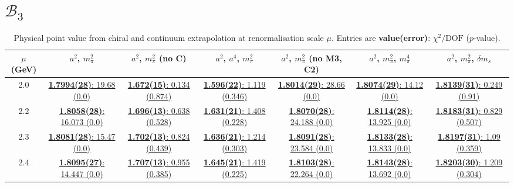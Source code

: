 \documentclass[12pt]{extarticle}
\begin{document}
\section{$\mathcal{B}_3$}
\begin{table}[h!]
\begin{center}
\begin{tabular}{|c|c|c|c|c|c|c|}
\hline
$\mu$ (GeV) & $a^2$, $m_\pi^2$& $a^2$, $m_\pi^2$ (no C)& $a^2$, $a^4$, $m_\pi^2$& $a^2$, $m_\pi^2$ (no M3, C2)& $a^2$, $m_\pi^2$, $m_\pi^4$& $a^2$, $m_\pi^2$, $\delta m_s$\\
\hline
2.0& \hyperlink{SSmPP/NPR/a2m2_20.pdf.1}{\textbf{1.7994(28)}: 19.68 (0.0)} & \hyperlink{SSmPP/NPR/a2m2noC_20.pdf.1}{\textbf{1.672(15)}: 0.134 (0.874)} & \hyperlink{SSmPP/NPR/a2a4m2_20.pdf.1}{\textbf{1.596(22)}: 1.119 (0.346)} & \hyperlink{SSmPP/NPR/a2m2mcut_20.pdf.1}{\textbf{1.8014(29)}: 28.66 (0.0)} & \hyperlink{SSmPP/NPR/a2m2m4_20.pdf.1}{\textbf{1.8074(29)}: 14.12 (0.0)} & \hyperlink{SSmPP/NPR/a2m2delm_20.pdf.1}{\textbf{1.8139(31)}: 0.249 (0.91)}\\
2.2& \hyperlink{SSmPP/NPR/a2m2_22.pdf.1}{\textbf{1.8058(28)}: 16.073 (0.0)} & \hyperlink{SSmPP/NPR/a2m2noC_22.pdf.1}{\textbf{1.696(13)}: 0.638 (0.528)} & \hyperlink{SSmPP/NPR/a2a4m2_22.pdf.1}{\textbf{1.631(21)}: 1.408 (0.228)} & \hyperlink{SSmPP/NPR/a2m2mcut_22.pdf.1}{\textbf{1.8070(28)}: 24.188 (0.0)} & \hyperlink{SSmPP/NPR/a2m2m4_22.pdf.1}{\textbf{1.8114(28)}: 13.925 (0.0)} & \hyperlink{SSmPP/NPR/a2m2delm_22.pdf.1}{\textbf{1.8183(31)}: 0.829 (0.507)}\\
2.3& \hyperlink{SSmPP/NPR/a2m2_23.pdf.1}{\textbf{1.8081(28)}: 15.47 (0.0)} & \hyperlink{SSmPP/NPR/a2m2noC_23.pdf.1}{\textbf{1.702(13)}: 0.824 (0.439)} & \hyperlink{SSmPP/NPR/a2a4m2_23.pdf.1}{\textbf{1.636(21)}: 1.214 (0.303)} & \hyperlink{SSmPP/NPR/a2m2mcut_23.pdf.1}{\textbf{1.8091(28)}: 23.584 (0.0)} & \hyperlink{SSmPP/NPR/a2m2m4_23.pdf.1}{\textbf{1.8133(28)}: 13.833 (0.0)} & \hyperlink{SSmPP/NPR/a2m2delm_23.pdf.1}{\textbf{1.8197(31)}: 1.09 (0.359)}\\
2.4& \hyperlink{SSmPP/NPR/a2m2_24.pdf.1}{\textbf{1.8095(27)}: 14.447 (0.0)} & \hyperlink{SSmPP/NPR/a2m2noC_24.pdf.1}{\textbf{1.707(13)}: 0.955 (0.385)} & \hyperlink{SSmPP/NPR/a2a4m2_24.pdf.1}{\textbf{1.645(21)}: 1.419 (0.225)} & \hyperlink{SSmPP/NPR/a2m2mcut_24.pdf.1}{\textbf{1.8103(28)}: 22.264 (0.0)} & \hyperlink{SSmPP/NPR/a2m2m4_24.pdf.1}{\textbf{1.8143(28)}: 13.692 (0.0)} & \hyperlink{SSmPP/NPR/a2m2delm_24.pdf.1}{\textbf{1.8203(30)}: 1.209 (0.304)}\\
\hline
\end{tabular}
\caption{Physical point value from chiral and continuum extrapolation at renormalisation scale $\mu$. Entries are \textbf{value(error)}: $\chi^2/\text{DOF}$ ($p$-value).}
\end{center}
\end{table}
\end{document}
